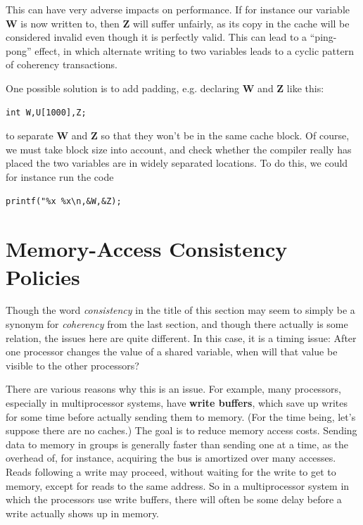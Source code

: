 This can have very adverse impacts on performance.  If for instance our
variable {\bf W} is now written to, then {\bf Z} will suffer unfairly,
as its copy in the cache will be considered invalid even though it is
perfectly valid.  This can lead to a ``ping-pong'' effect, in which
alternate writing to two variables leads to a cyclic pattern of
coherency transactions. 

One possible solution is to add padding, e.g. declaring {\bf W} and {\bf
Z} like this:

\begin{Verbatim}[fontsize=\relsize{-2}]
int W,U[1000],Z;
\end{Verbatim}

to separate {\bf W} and {\bf Z} so that they won't be in the same cache
block.  Of course, we must take block size into account, and check
whether the compiler really has placed the two variables are in widely
separated locations.  To do this, we could for instance run the code

\begin{Verbatim}[fontsize=\relsize{-2}]
printf("%x %x\n,&W,&Z);
\end{Verbatim}

\section{Memory-Access Consistency Policies}
\label{consistency}

Though the word {\it consistency} in the title of this section may seem
to simply be a synonym for {\it coherency} from the last section, and
though there actually is some relation, the issues here are quite
different.  In this case, it is a timing issue:  After one processor
changes the value of a shared variable, when will that value be
visible to the other processors? 

There are various reasons why this is an issue.  For example, many
processors, especially in multiprocessor systems, have {\bf write
buffers}, which save up writes for some time before actually sending
them to memory.  (For the time being, let's suppose there are no
caches.) The goal is to reduce memory access costs.  Sending data to
memory in groups is generally faster than sending one at a time, as the
overhead of, for instance, acquiring the bus is amortized over many
accesses.  Reads following a write may proceed, without waiting for the
write to get to memory, except for reads to the same address.  So in a
multiprocessor system in which the processors use write buffers, there
will often be some delay before a write actually shows up in memory.

